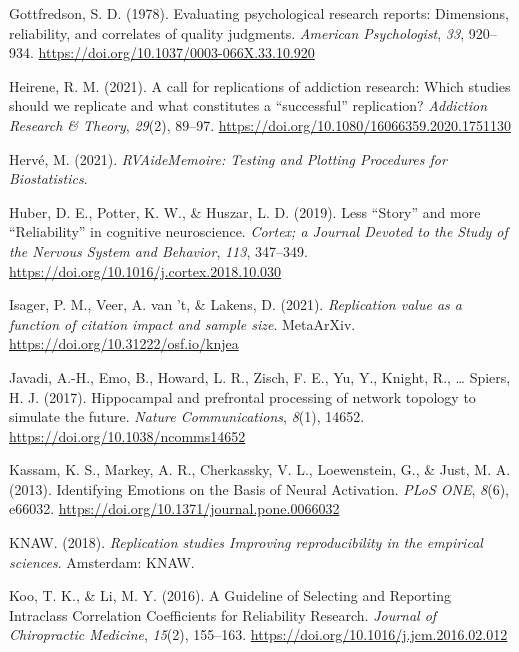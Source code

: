 \documentclass[
  man,floatsintext]{apa6}
\newlength{\cslhangindent}
\newlength{\cslentryspacingunit} %
\newenvironment{CSLReferences}[2] %
 {%
  \setlength{\parindent}{0pt}
  \ifodd #1
  \let\oldpar\par
  \def\par{\hangindent=\cslhangindent\oldpar}
  \fi
  \setlength{\parskip}{#2\cslentryspacingunit}
 }%
 {}
\begin{document}
\begin{CSLReferences}{1}{0}
\leavevmode{}%
Gottfredson, S. D. (1978). Evaluating psychological research reports: {Dimensions}, reliability, and correlates of quality judgments. \emph{American Psychologist}, \emph{33}, 920--934. \url{https://doi.org/10.1037/0003-066X.33.10.920}

\leavevmode{}%
Heirene, R. M. (2021). A call for replications of addiction research: Which studies should we replicate and what constitutes a {``successful''} replication? \emph{Addiction Research \& Theory}, \emph{29}(2), 89--97. \url{https://doi.org/10.1080/16066359.2020.1751130}

\leavevmode{}%
Hervé, M. (2021). \emph{{RVAideMemoire}: {Testing} and {Plotting Procedures} for {Biostatistics}}.

\leavevmode{}%
Huber, D. E., Potter, K. W., \& Huszar, L. D. (2019). Less {``{Story}''} and more {``{Reliability}''} in cognitive neuroscience. \emph{Cortex; a Journal Devoted to the Study of the Nervous System and Behavior}, \emph{113}, 347--349. \url{https://doi.org/10.1016/j.cortex.2018.10.030}

\leavevmode{}%
Isager, P. M., Veer, A. van 't, \& Lakens, D. (2021). \emph{Replication value as a function of citation impact and sample size}. {MetaArXiv}. \url{https://doi.org/10.31222/osf.io/knjea}

\leavevmode{}%
Javadi, A.-H., Emo, B., Howard, L. R., Zisch, F. E., Yu, Y., Knight, R., \ldots{} Spiers, H. J. (2017). Hippocampal and prefrontal processing of network topology to simulate the future. \emph{Nature Communications}, \emph{8}(1), 14652. \url{https://doi.org/10.1038/ncomms14652}

\leavevmode{}%
Kassam, K. S., Markey, A. R., Cherkassky, V. L., Loewenstein, G., \& Just, M. A. (2013). Identifying {Emotions} on the {Basis} of {Neural Activation}. \emph{PLoS ONE}, \emph{8}(6), e66032. \url{https://doi.org/10.1371/journal.pone.0066032}

\leavevmode{}%
KNAW. (2018). \emph{Replication studies \textendash{} {Improving} reproducibility in the empirical sciences}. {Amsterdam}: {KNAW}.

\leavevmode{}%
Koo, T. K., \& Li, M. Y. (2016). A {Guideline} of {Selecting} and {Reporting Intraclass Correlation Coefficients} for {Reliability Research}. \emph{Journal of Chiropractic Medicine}, \emph{15}(2), 155--163. \url{https://doi.org/10.1016/j.jcm.2016.02.012}


\end{CSLReferences}
\end{document}
